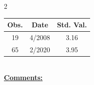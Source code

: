 
\bigskip 
\begin{multicols}{2}{ 
\begin{tabular}{ccc}
\hline  Obs.  &  Date &  Std. Val. \\ 
\hline 
                       19 &        4/2008 &          3.16 \vspace{-.12in} \\  
                       65 &        2/2020 &          3.95 \vspace{-.12in} \\  
 \end{tabular} 
\\ 
 \columnbreak 
 \singlespacing 
 \underline{\textbf{Comments:}} \\ 
 \bigskip       

 } 
\end{multicols} 
